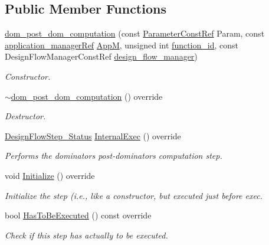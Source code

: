 \subsection*{Public Member Functions}
\begin{DoxyCompactItemize}
\item 
\hyperlink{classdom__post__dom__computation_ab5a369e367060c93732266da7cf2f062}{dom\+\_\+post\+\_\+dom\+\_\+computation} (const \hyperlink{Parameter_8hpp_a37841774a6fcb479b597fdf8955eb4ea}{Parameter\+Const\+Ref} Param, const \hyperlink{application__manager_8hpp_a04ccad4e5ee401e8934306672082c180}{application\+\_\+manager\+Ref} \hyperlink{classFrontendFlowStep_a0ac0d8db2a378416583f51c4faa59d15}{AppM}, unsigned int \hyperlink{classFunctionFrontendFlowStep_a58ef2383ad1a212a8d3f396625a4b616}{function\+\_\+id}, const Design\+Flow\+Manager\+Const\+Ref \hyperlink{classDesignFlowStep_ab770677ddf087613add30024e16a5554}{design\+\_\+flow\+\_\+manager})
\begin{DoxyCompactList}\small\item\em Constructor. \end{DoxyCompactList}\item 
\hyperlink{classdom__post__dom__computation_a735e5895c025d0edc43db0e9be5c8b8c}{$\sim$dom\+\_\+post\+\_\+dom\+\_\+computation} () override
\begin{DoxyCompactList}\small\item\em Destructor. \end{DoxyCompactList}\item 
\hyperlink{design__flow__step_8hpp_afb1f0d73069c26076b8d31dbc8ebecdf}{Design\+Flow\+Step\+\_\+\+Status} \hyperlink{classdom__post__dom__computation_abbbb4f87f023daa6c79cf21ff1238044}{Internal\+Exec} () override
\begin{DoxyCompactList}\small\item\em Performs the dominators post-\/dominators computation step. \end{DoxyCompactList}\item 
void \hyperlink{classdom__post__dom__computation_a6ee3cd25445edae2d45bf4a77564f11f}{Initialize} () override
\begin{DoxyCompactList}\small\item\em Initialize the step (i.\+e., like a constructor, but executed just before exec. \end{DoxyCompactList}\item 
bool \hyperlink{classdom__post__dom__computation_a4b744602d67b99a29be3a61b769bad7a}{Has\+To\+Be\+Executed} () const override
\begin{DoxyCompactList}\small\item\em Check if this step has actually to be executed. \end{DoxyCompactList}\end{DoxyCompactItemize}
